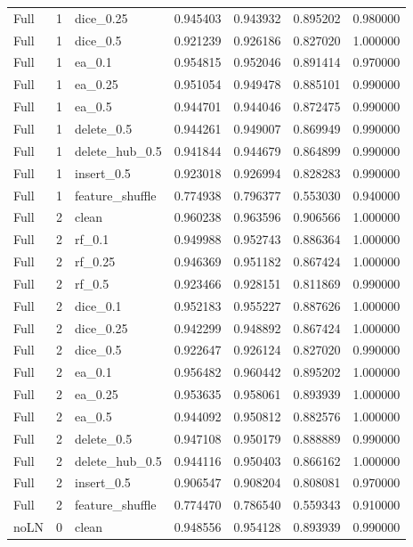 \documentclass[UTF8,a4paper,11pt,fontset=fandol]{ctexart}
\begin{document}
{\begin{longtable}{lrlrrrr}
Full & 1 & dice\_0.25 & 0.945403 & 0.943932 & 0.895202 & 0.980000 \\
Full & 1 & dice\_0.5 & 0.921239 & 0.926186 & 0.827020 & 1.000000 \\
Full & 1 & ea\_0.1 & 0.954815 & 0.952046 & 0.891414 & 0.970000 \\
Full & 1 & ea\_0.25 & 0.951054 & 0.949478 & 0.885101 & 0.990000 \\
Full & 1 & ea\_0.5 & 0.944701 & 0.944046 & 0.872475 & 0.990000 \\
Full & 1 & delete\_0.5 & 0.944261 & 0.949007 & 0.869949 & 0.990000 \\
Full & 1 & delete\_hub\_0.5 & 0.941844 & 0.944679 & 0.864899 & 0.990000 \\
Full & 1 & insert\_0.5 & 0.923018 & 0.926994 & 0.828283 & 0.990000 \\
Full & 1 & feature\_shuffle & 0.774938 & 0.796377 & 0.553030 & 0.940000 \\
Full & 2 & clean & 0.960238 & 0.963596 & 0.906566 & 1.000000 \\
Full & 2 & rf\_0.1 & 0.949988 & 0.952743 & 0.886364 & 1.000000 \\
Full & 2 & rf\_0.25 & 0.946369 & 0.951182 & 0.867424 & 1.000000 \\
Full & 2 & rf\_0.5 & 0.923466 & 0.928151 & 0.811869 & 0.990000 \\
Full & 2 & dice\_0.1 & 0.952183 & 0.955227 & 0.887626 & 1.000000 \\
Full & 2 & dice\_0.25 & 0.942299 & 0.948892 & 0.867424 & 1.000000 \\
Full & 2 & dice\_0.5 & 0.922647 & 0.926124 & 0.827020 & 0.990000 \\
Full & 2 & ea\_0.1 & 0.956482 & 0.960442 & 0.895202 & 1.000000 \\
Full & 2 & ea\_0.25 & 0.953635 & 0.958061 & 0.893939 & 1.000000 \\
Full & 2 & ea\_0.5 & 0.944092 & 0.950812 & 0.882576 & 1.000000 \\
Full & 2 & delete\_0.5 & 0.947108 & 0.950179 & 0.888889 & 0.990000 \\
Full & 2 & delete\_hub\_0.5 & 0.944116 & 0.950403 & 0.866162 & 1.000000 \\
Full & 2 & insert\_0.5 & 0.906547 & 0.908204 & 0.808081 & 0.970000 \\
Full & 2 & feature\_shuffle & 0.774470 & 0.786540 & 0.559343 & 0.910000 \\
noLN & 0 & clean & 0.948556 & 0.954128 & 0.893939 & 0.990000 \\

\end{longtable}}
\end{document}
